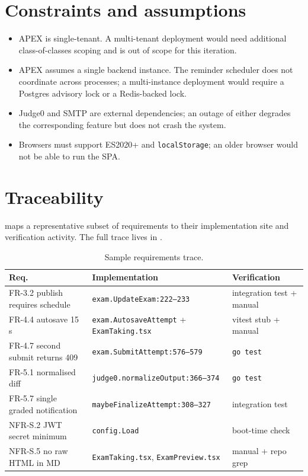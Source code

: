 \section{Constraints and assumptions}

\begin{itemize}
  \item APEX is single-tenant. A multi-tenant deployment would need additional class-of-classes scoping and is out of scope for this iteration.
  \item APEX assumes a single backend instance. The reminder scheduler does not coordinate across processes; a multi-instance deployment would require a Postgres advisory lock or a Redis-backed lock.
  \item Judge0 and SMTP are external dependencies; an outage of either degrades the corresponding feature but does not crash the system.
  \item Browsers must support ES2020+ and \texttt{localStorage}; an older browser would not be able to run the SPA.
\end{itemize}

\section{Traceability}

 maps a representative subset of requirements to their implementation site and verification activity. The full trace lives in .

\begin{table}[H]
  \centering
  \caption{Sample requirements trace.}
  \label{tab:requirements-trace}
  \small
  \begin{tabularx}{\linewidth}{p{4cm} X X}
    \toprule
    Req. & Implementation & Verification \\
    \midrule
    FR-3.2 publish requires schedule & \texttt{exam.UpdateExam:222--233}                        & integration test + manual \\
    FR-4.4 autosave 15 s             & \texttt{exam.AutosaveAttempt} + \texttt{ExamTaking.tsx} & vitest stub + manual \\
    FR-4.7 second submit returns 409 & \texttt{exam.SubmitAttempt:576--579}                    & \texttt{go test} \\
    FR-5.1 normalised diff           & \texttt{judge0.normalizeOutput:366--374}                & \texttt{go test} \\
    FR-5.7 single graded notification & \texttt{maybeFinalizeAttempt:308--327}                  & integration test \\
    NFR-S.2 JWT secret minimum       & \texttt{config.Load}                                    & boot-time check \\
    NFR-S.5 no raw HTML in MD        & \texttt{ExamTaking.tsx}, \texttt{ExamPreview.tsx}       & manual + repo grep \\
    \bottomrule
  \end{tabularx}
\end{table}

